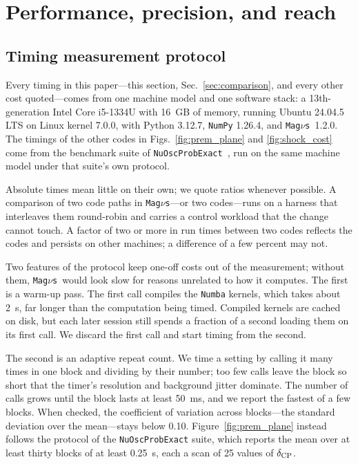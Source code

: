 \documentclass[final,5p,times,twocolumn,sort,compress]{elsarticle}
\makeatletter
\DeclareRobustCommand{\_}{%
  \ifmmode\nfss@text{\textunderscore}\else\textunderscore\allowbreak\fi}
\newcommand{\magnus}{{\tt Mag}\ensuremath{\nu}{\tt s}}
\makeatother
\begin{document}
\section{Performance, precision, and reach}
\label{sec:performance}


\subsection{Timing measurement protocol}
\label{sec:timing_protocol}

Every timing in this paper---this section, Sec.~\ref{sec:comparison}, and every other cost quoted---comes from one machine model and one software stack: a 13th-generation Intel Core i5-1334U with 16~GB of memory, running Ubuntu 24.04.5 LTS on Linux kernel 7.0.0, with Python 3.12.7, {\tt NumPy} 1.26.4, and \magnus\ 1.2.0. The timings of the other codes in Figs.~\ref{fig:prem_plane} and \ref{fig:shock_cost} come from the benchmark suite of {\tt NuOscProbExact}~\cite{Bustamante:2019ggq, NuOscProbExact}, run on the same machine model under that suite's own protocol.

Absolute times mean little on their own; we quote ratios whenever possible. A comparison of two code paths in \magnus---or two codes---runs on a harness that interleaves them round-robin and carries a control workload that the change cannot touch. A factor of two or more in run times between two codes reflects the codes and persists on other machines; a difference of a few percent may not.

Two features of the protocol keep one-off costs out of the measurement; without them, \magnus\ would look slow for reasons unrelated to how it computes. The first is a warm-up pass. The first call compiles the {\tt Numba} kernels, which takes about 2~s, far longer than the computation being timed. Compiled kernels are cached on disk, but each later session still spends a fraction of a second loading them on its first call. We discard the first call and start timing from the second.

The second is an adaptive repeat count. We time a setting by calling it many times in one block and dividing by their number; too few calls leave the block so short that the timer's resolution and background jitter dominate. The number of calls grows until the block lasts at least 50~ms, and we report the fastest of a few blocks. When checked, the coefficient of variation across blocks---the standard deviation over the mean---stays below 0.10. Figure~\ref{fig:prem_plane} instead follows the protocol of the {\tt NuOscProbExact} suite, which reports the mean over at least thirty blocks of at least 0.25~s, each a scan of 25 values of $\delta_{\rm CP}$.
\end{document}
